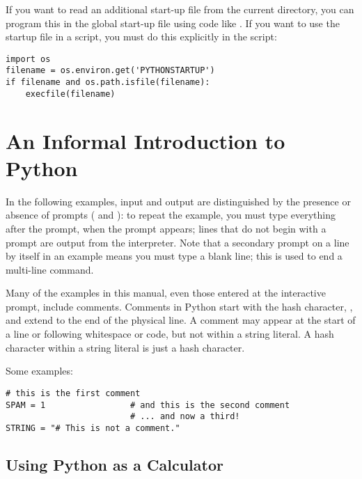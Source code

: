 \documentclass{manual}
\begin{document}
If you want to read an additional start-up file from the current
directory, you can program this in the global start-up file using code
like .  If you want to use the startup file in a
script, you must do this explicitly in the script:

\begin{verbatim}
import os
filename = os.environ.get('PYTHONSTARTUP')
if filename and os.path.isfile(filename):
    execfile(filename)
\end{verbatim}


\chapter{An Informal Introduction to Python \label{informal}}

In the following examples, input and output are distinguished by the
presence or absence of prompts (\samp{>\code{>}>~} and ): to repeat
the example, you must type everything after the prompt, when the
prompt appears; lines that do not begin with a prompt are output from
the interpreter. %
Note that a secondary prompt on a line by itself in an example means
you must type a blank line; this is used to end a multi-line command.

Many of the examples in this manual, even those entered at the
interactive prompt, include comments.  Comments in Python start with
the hash character, \character{\#}, and extend to the end of the
physical line.  A comment may appear at the start of a line or
following whitespace or code, but not within a string literal.  A hash 
character within a string literal is just a hash character.

Some examples:

\begin{verbatim}
# this is the first comment
SPAM = 1                 # and this is the second comment
                         # ... and now a third!
STRING = "# This is not a comment."
\end{verbatim}


\section{Using Python as a Calculator \label{calculator}}
\end{document}
